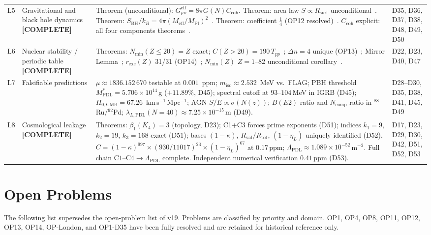\documentclass[11pt,a4paper]{article}
\newcommand{\Rval}{R_{\mathrm{val}}}
\theoremstyle{plain}
\theoremstyle{definition}
\theoremstyle{remark}
\newcommand{\Rsurf}{R_{\mathrm{surf}}}
\newcommand{\Rtot}{R_{\mathrm{tot}}}
\newcommand{\SBH}{S_{\mathrm{BH}}}
\newcommand{\Meff}{M_{\mathrm{eff}}}
\newcommand{\MPl}{M_{\mathrm{Pl}}}
\newcommand{\Tpp}{T_{pp}}
\newcommand{\Ccoh}{C_{\mathrm{coh}}}
\begin{document}
\begin{longtable}{L{0.6cm}L{3.0cm}L{5.5cm}L{4.0cm}}
L5 & Gravitational and black hole dynamics \textbf{[COMPLETE]} & \textcolor{proofblue}{Theorem} (unconditional): $G_{\mu\nu}^{\mathrm{eff}}=8\pi G(N)\Ccoh$. \textcolor{proofblue}{Theorem}: area law $S\propto\Rsurf$ unconditional~\cite{D37}. \textcolor{proofblue}{Theorem}: $\SBH/k_B=4\pi(\Meff/\MPl)^2$~\cite{D38}. \textcolor{proofblue}{Theorem}: coefficient $\tfrac{1}{4}$ (OP12 resolved)~\cite{D50}. $\Ccoh$ explicit: all four components theorems~\cite{D48,D51,D52}. & D35, D36, D37, D38, D48, D49, D50\\[0.4em]
L6 & Nuclear stability / periodic table \textbf{[COMPLETE]} & \textcolor{proofblue}{Theorems}: $N_{\min}(Z\leq20)=Z$ exact; $C(Z>20)=190\,\Tpp$~\cite{D40}; $\Delta n=4$ unique (OP13)~\cite{D47}; Mirror Lemma~\cite{D47}; $r_{\mathrm{exc}}(Z)$ 31/31 (OP14)~\cite{D47}; $N_{\min}(Z)$ $Z=1$--82 unconditional corollary~\cite{D47}. & D22, D23, D40, D47\\[0.4em]
L7 & Falsifiable predictions & $\mu\approx 1836.152\,670$ testable at $0.001$~ppm; $m_{\mathrm{iso}}\approx 2.532$~MeV vs.\ FLAG; PBH threshold $M^*_{\mathrm{PDL}}=5.706\times10^{14}$\,g ($+11.89\%$, D45); spectral cutoff at $93$--$104$\,MeV in IGRB (D45); $H_{0,\mathrm{CMB}}=67.26$~km\,s$^{-1}$\,Mpc$^{-1}$; AGN $S/E \propto \sigma(N(z))$; $B(E2)$ ratio and $N_{\mathrm{comp}}$ ratio in $^{88}$Ru/$^{92}$Pd; $\lambda_{L,\mathrm{PDL}}(N=40) \approx 7.25\times10^{-15}$\,m (D49). & D28--D30, D35, D38, D41, D45, D49\\[0.3em]
L8 & Cosmological leakage \textbf{[COMPLETE]} & \textcolor{proofblue}{Theorems}: $\beta_1(K_4)=3$ (topology, D23); C1+C3 forces prime exponents (D51); indices $k_1=9$, $k_2=19$, $k_3=168$ exact (D51); bases $(1-\kappa)$, $\Rval/\Rtot$, $(1-\eta_L)$ uniquely identified (D52). $C=(1-\kappa)^{997}\times(930/11017)^{23}\times(1-\eta_L)^{67}$ at 0.17\,ppm; $\Lambda_{\mathrm{PDL}}\approx 1.089\times10^{-52}$\,m$^{-2}$. Full chain $\mathrm{C1\text{--}C4}\to\Lambda_{\mathrm{PDL}}$ complete. Independent numerical verification $0.41$\,ppm (D53). & D17, D23, D29, D30, D42, D51, D52, D53\\[0.3em]
\end{longtable}

\section{Open Problems}
\label{sec:openproblems}

The following list supersedes the open-problem list of v19. Problems are classified by priority and domain. OP1, OP4, OP8, OP11, OP12, OP13, OP14, OP-London, and OP1-D35 have been fully resolved and are retained for historical reference only.
\end{document}
